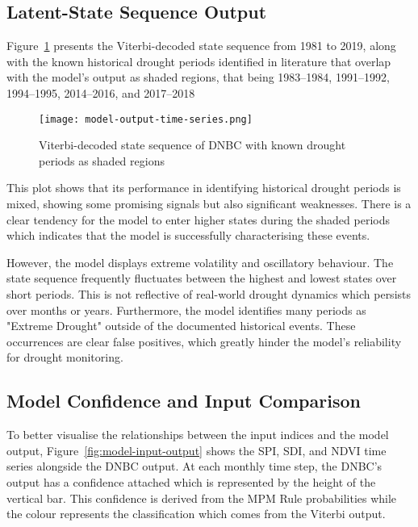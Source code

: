 \subsection{Latent-State Sequence Output}

Figure~\ref{fig:model-output-time-series} presents the Viterbi-decoded state sequence from 1981 to 2019, along with the known historical drought periods identified in literature that overlap with the model's output as shaded regions, that being 1983–1984, 1991–1992, 1994–1995, 2014–2016, and 2017–2018 

\begin{figure}[!h]
    \centering
    \texttt{[image: model-output-time-series.png]}
    \caption[DNBC State Sequence]{Viterbi-decoded state sequence of DNBC with known drought periods as shaded regions }
    \label{fig:model-output-time-series}
\end{figure}

This plot shows that its performance in identifying historical drought periods is mixed, showing some promising signals but also significant weaknesses. There is a clear tendency for the model to enter higher states during the shaded periods which indicates that the model is successfully characterising these events.

However, the model displays extreme volatility and oscillatory behaviour. The state sequence frequently fluctuates between the highest and lowest states over short periods. This is not reflective of real-world drought dynamics which persists over months or years. Furthermore, the model identifies many periods as "Extreme Drought" outside of the documented historical events. These occurrences are clear false positives, which greatly hinder the model's reliability for drought monitoring.

\subsection{Model Confidence and Input Comparison}

To better visualise the relationships between the input indices and the model output, Figure~\ref{fig:model-input-output} shows the SPI, SDI, and NDVI time series alongside the DNBC output. At each monthly time step, the DNBC's output has a confidence attached which is represented by the height of the vertical bar. This confidence is derived from the MPM Rule probabilities while the colour represents the classification which comes from the Viterbi output.

